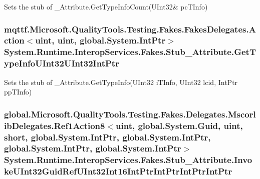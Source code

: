 Sets the stub of \-\_\-\-Attribute.\-Get\-Type\-Info\-Count(U\-Int32\& pc\-T\-Info)

\hypertarget{class_system_1_1_runtime_1_1_interop_services_1_1_fakes_1_1_stub___attribute_a9c5bca549aafbb4d72a12629efad0c88}{
\subsubsection[{Get\-Type\-Info\-U\-Int32\-U\-Int32\-Int\-Ptr}]{\setlength{\rightskip}{0pt plus 5cm}mqttf.\-Microsoft.\-Quality\-Tools.\-Testing.\-Fakes.\-Fakes\-Delegates.\-Action$<$uint, uint, global.\-System.\-Int\-Ptr$>$ System.\-Runtime.\-Interop\-Services.\-Fakes.\-Stub\-\_\-\-Attribute.\-Get\-Type\-Info\-U\-Int32\-U\-Int32\-Int\-Ptr}}\label{class_system_1_1_runtime_1_1_interop_services_1_1_fakes_1_1_stub___attribute_a9c5bca549aafbb4d72a12629efad0c88}


Sets the stub of \-\_\-\-Attribute.\-Get\-Type\-Info(\-U\-Int32 i\-T\-Info, U\-Int32 lcid, Int\-Ptr pp\-T\-Info)

\hypertarget{class_system_1_1_runtime_1_1_interop_services_1_1_fakes_1_1_stub___attribute_a06494f9e7062b3bfb87918de3f3655c5}{
\subsubsection[{Invoke\-U\-Int32\-Guid\-Ref\-U\-Int32\-Int16\-Int\-Ptr\-Int\-Ptr\-Int\-Ptr\-Int\-Ptr}]{\setlength{\rightskip}{0pt plus 5cm}global.\-Microsoft.\-Quality\-Tools.\-Testing.\-Fakes.\-Delegates.\-Mscorlib\-Delegates.\-Ref1\-Action8$<$uint, global.\-System.\-Guid, uint, short, global.\-System.\-Int\-Ptr, global.\-System.\-Int\-Ptr, global.\-System.\-Int\-Ptr, global.\-System.\-Int\-Ptr$>$ System.\-Runtime.\-Interop\-Services.\-Fakes.\-Stub\-\_\-\-Attribute.\-Invoke\-U\-Int32\-Guid\-Ref\-U\-Int32\-Int16\-Int\-Ptr\-Int\-Ptr\-Int\-Ptr\-Int\-Ptr}}\label{class_system_1_1_runtime_1_1_interop_services_1_1_fakes_1_1_stub___attribute_a06494f9e7062b3bfb87918de3f3655c5}


